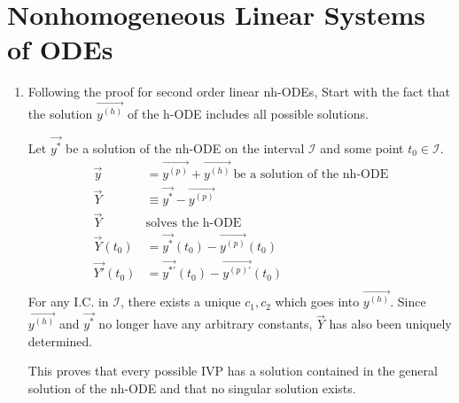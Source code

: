 \section{Nonhomogeneous Linear Systems of ODEs}

\begin{enumerate}
    \item Following the proof for second order linear nh-ODEs,
          Start with the fact that the solution $ \vec{y^{(h)}} $ of the
          h-ODE includes all possible solutions. \par

          Let $ \vec{y^{*}} $ be a solution of the nh-ODE on the interval
          $ \mathcal{I} $ and some point $ t_0 \in \mathcal{I} $.
          \begin{align}
              \vec{y}       & = \vec{y^{(p)}} + \vec{y^{(h)}}\
              \text{be a solution of the nh-ODE}                        \\
              \vec{Y}       & \equiv \vec{y^{*}} - \vec{y^{(p)}}        \\
              \vec{Y}\      & \text{solves the h-ODE}                   \\
              \vec{Y}(t_0)  & = \vec{y^{*}}(t_0) - \vec{y^{(p)}}(t_0)   \\
              \vec{Y'}(t_0) & = \vec{y^{*'}}(t_0) - \vec{y^{(p)'}}(t_0) \\
          \end{align}
          For any I.C. in $ \mathcal{I} $, there exists a unique $ c_1, c_2 $
          which goes into $ \vec{y^{(h)}} $. Since $ \vec{y^{(h)}} $ and
          $\vec{y^{*}}$ no longer have any arbitrary constants, $ \vec{Y} $
          has also been uniquely determined. \par

          This proves that every possible IVP has a solution contained in the
          general solution of the nh-ODE and that no singular solution exists.


\end{enumerate}
